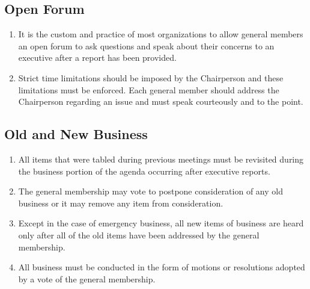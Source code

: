\documentclass[12pt]{article}
\begin{document}
\subsection{Open Forum}
\begin{enumerate}[{A.5}.1]
    \item It is the custom and practice of most organizations to allow general members an open forum to ask questions and speak about their concerns to an executive after a report has been provided.
    \item Strict time limitations should be imposed by the Chairperson and these limitations must be enforced. Each general member should address the Chairperson regarding an issue and must speak courteously and to the point.
\end{enumerate}


\subsection{Old and New Business}
\begin{enumerate}[{A.6}.1]
    \item	All items that were tabled during previous meetings must be revisited during the business portion of the agenda occurring after executive reports. 
    \item	The general membership may vote to postpone consideration of any old business or it may remove any item from consideration.
    \item	Except in the case of emergency business, all new items of business are heard only after all of the old items have been addressed by the general membership. 
    \item	All business must be conducted in the form of motions or resolutions adopted by a vote of the general membership.
\end{enumerate}


\end{document}
